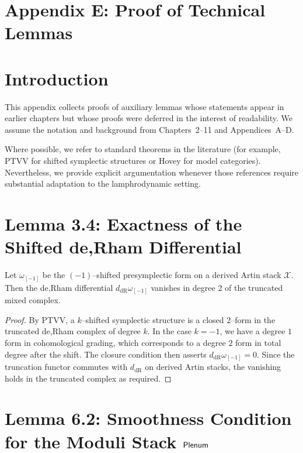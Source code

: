 \section*{Appendix E: Proof of Technical Lemmas}

\section{Introduction}

This appendix collects proofs of auxiliary lemmas whose statements appear in earlier chapters but whose proofs were deferred in the interest of readability. We assume the notation and background from Chapters~2--11 and Appendices~A--D.

Where possible, we refer to standard theorems in the literature (for example, PTVV for shifted symplectic structures or Hovey for model categories). Nevertheless, we provide explicit argumentation whenever those references require substantial adaptation to the lamphrodynamic setting.

\section{Lemma 3.4: Exactness of the Shifted de,Rham Differential}

\begin{lemma}[Lemma 3.4]
Let $\omega_{[-1]}$ be the $(-1)$--shifted presymplectic form on a derived Artin stack $\mathcal{X}$. Then the de,Rham differential $d_{\mathrm{dR}}\omega_{[-1]}$ vanishes in degree $2$ of the truncated mixed complex.
\end{lemma}

\begin{proof}
By PTVV, a $k$--shifted symplectic structure is a closed 2--form in the truncated de,Rham complex of degree $k$. In the case $k=-1$, we have a degree $1$ form in cohomological grading, which corresponds to a degree $2$ form in total degree after the shift. The closure condition then asserts $d_{\mathrm{dR}}\omega_{[-1]}=0$. Since the truncation functor commutes with $d_{\mathrm{dR}}$ on derived Artin stacks, the vanishing holds in the truncated complex as required.
\end{proof}

\section{Lemma 6.2: Smoothness Condition for the Moduli Stack $\mathsf{Plenum}$}

